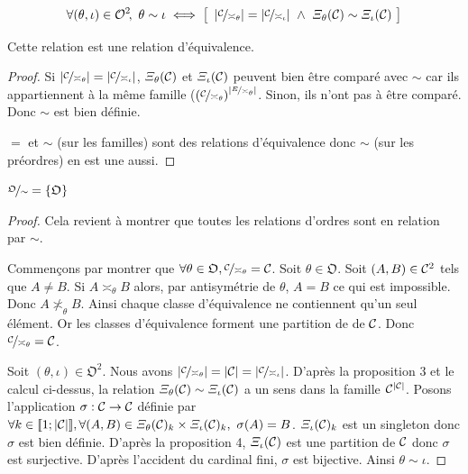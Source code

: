 \begin{definition}
	\begin{equation}
		\forall (\theta, \iota) \in \mathcal{O}^2\!, \
		\theta \sim \iota \iff
		\big[ \
			\left|\nicefrac{\mathcal{C}}{\asymp_\theta}\right| = \left|\nicefrac{\mathcal{C}}{\asymp_\iota}\right|
			\ \wedge \
			\varXi_\theta(\mathcal{C}) \sim \varXi_\iota(\mathcal{C})
		\ \big]
	\end{equation}
\end{definition}

\begin{proposition}
	Cette relation est une relation d'équivalence.
\end{proposition}

\begin{proof}
	Si $\left|\nicefrac{\mathcal{C}}{\asymp_\theta}\right| = \left|\nicefrac{\mathcal{C}}{\asymp_\iota}\right|$, $\varXi_\theta(\mathcal{C})$ et $\varXi_\iota(\mathcal{C})$ peuvent bien être comparé avec $\sim$ car ils appartiennent à la même famille ($\left(\nicefrac{\mathcal{C}}{\asymp_\theta}\right)^{\left|\nicefrac{E}{\asymp_\theta}\right|}$. Sinon, ils n'ont pas à être comparé. Donc $\sim$ est bien définie.
	
	$=$ et $\sim$ (sur les familles) sont des relations d'équivalence donc $\sim$ (sur les préordres) en est une aussi.
\end{proof}

\begin{proposition}
	$\nicefrac{\mathfrak{O}}{\sim} = \{\mathfrak{O}\}$
\end{proposition}

\begin{proof}
	Cela revient à montrer que toutes les relations d'ordres sont en relation par $\sim$.
	
	Commençons par montrer que $\forall \theta \in \mathfrak{O}, \nicefrac{\mathcal{C}}{\asymp_\theta} = \mathcal{C}$.
	Soit $\theta \in \mathfrak{O}$. Soit $(A, B) \in \mathcal{C}^2$ tels que $A \neq B$.
	Si $A \asymp_\theta B$ alors, par antisymétrie de $\theta$, $A = B$ ce qui est impossible.
	Donc $A \not \asymp_\theta B$. Ainsi chaque classe d'équivalence ne contiennent qu'un seul élément.
	Or les classes d'équivalence forment une partition de de $\mathcal{C}$. Donc $\nicefrac{\mathcal{C}}{\asymp_\theta} = \mathcal{C}$.
	
	Soit $(\theta, \iota) \in \mathfrak{O}^2$.
	Nous avons $\left|\nicefrac{\mathcal{C}}{\asymp_\theta}\right| = \left|\mathcal{C}\right| = \left|\nicefrac{\mathcal{C}}{\asymp_\iota}\right|$.
	D'après la proposition 3 et le calcul ci-dessus, la relation $\varXi_\theta(\mathcal{C}) \sim \varXi_\iota(\mathcal{C})$ a un sens dans la famille $\mathcal{C}^{\left|\mathcal{C}\right|}$.
	Posons l'application $\sigma : \mathcal{C} \rightarrow \mathcal{C}$ définie par $\forall k \in [\![1;|\mathcal{C}|]\!], \forall (A, B) \in \varXi_\theta(\mathcal{C})_k \times \varXi_\iota(\mathcal{C})_k, \ \sigma(A) = B$.
	$\varXi_\iota(\mathcal{C})_k$ est un singleton donc $\sigma$ est bien définie.
	D'après la proposition 4, $\varXi_\iota(\mathcal{C})$ est une partition de $\mathcal{C}$ donc $\sigma$ est surjective.
	D'après l'accident du cardinal fini, $\sigma$ est bijective.
	Ainsi $\theta \sim \iota$.
\end{proof}

